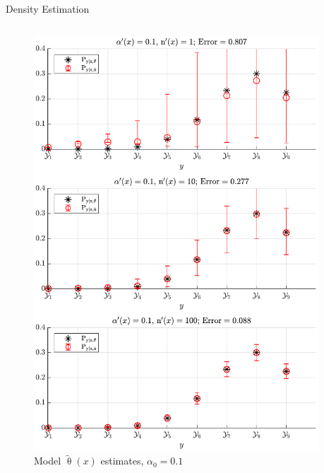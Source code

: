\documentclass[final]{beamer}
\begin{document}
\begin{frame}{}
\begin{columns}[t]
\begin{column}{.32\linewidth}
\begin{block}{Density Estimation}
\begin{columns}[t]
\begin{column}{.5\linewidth}
\begin{figure}
\centering
\includegraphics[width=0.9\linewidth]{P_yx_error_a0_0_1.pdf}
\caption{Model $\tilde{\uptheta}(x)$ estimates, $\alpha_0 = 0.1$}
\label{fig:P_yx_error_a0_0_1}
\end{figure}

\end{column}
\begin{column}{.5\linewidth}


\end{column}
\end{columns}
\end{block}
\end{column}
\end{columns}
\end{frame}
\end{document}
